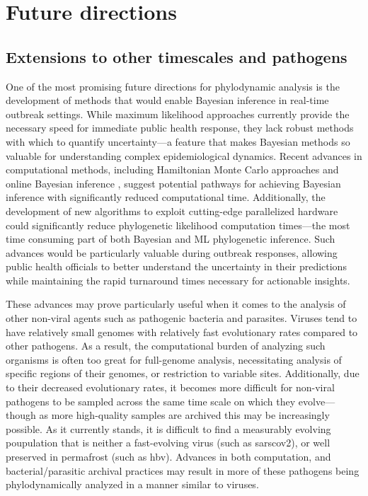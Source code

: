 \section{Future directions}
\subsection{Extensions to other timescales and pathogens}
One of the most promising future directions for phylodynamic analysis is the development of methods that would enable Bayesian inference in real-time outbreak settings.
While maximum likelihood approaches currently provide the necessary speed for immediate public health response, they lack robust methods with which to quantify uncertainty---a feature that makes Bayesian methods so valuable for understanding complex epidemiological dynamics.
Recent advances in computational methods, including Hamiltonian Monte Carlo approaches \citep{baele2020hamiltonian,ji2023scalable} and online Bayesian inference \citep{gill2020online,dinh2018online}, suggest potential pathways for achieving Bayesian inference with significantly reduced computational time.
Additionally, the development of new algorithms to exploit cutting-edge parallelized hardware \citep{suchard2009many-core,ayres2019beagle,gangavarapu2024many} could significantly reduce phylogenetic likelihood computation times---the most time consuming part of both Bayesian and ML phylogenetic inference.
Such advances would be particularly valuable during outbreak responses, allowing public health officials to better understand the uncertainty in their predictions while maintaining the rapid turnaround times necessary for actionable insights.

These advances may prove particularly useful when it comes to the analysis of other non-viral agents such as pathogenic bacteria and parasites.
Viruses tend to have relatively small genomes with relatively fast evolutionary rates \citep{duffy2008rates} compared to other pathogens.
As a result, the computational burden of analyzing such organisms is often too great for full-genome analysis, necessitating analysis of specific regions of their genomes, or restriction to variable sites.
Additionally, due to their decreased evolutionary rates, it becomes more difficult for non-viral pathogens to be sampled across the same time scale on which they evolve---though as more high-quality samples are archived this may be increasingly possible.
As it currently stands, it is difficult to find a measurably evolving poupulation that is neither a fast-evolving virus (such as \gls{sarscov2}), or well preserved in permafrost (such as \gls{hbv}).
Advances in both computation, and bacterial/parasitic archival practices may result in more of these pathogens being phylodynamically analyzed in a manner similar to viruses.

